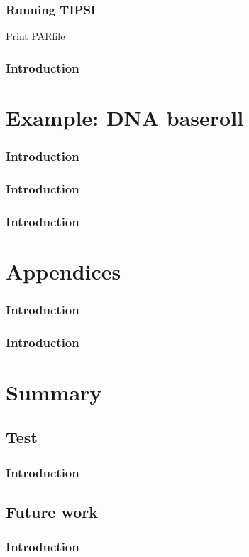 \documentclass[hyperref={pdfpagelabels=false}]{beamer}
\begin{document}
\begin{frame}
\frametitle{Running \textsc{TIPSI}} 

Print PARfile

\end{frame}

\begin{frame}
\frametitle{Introduction} 
\end{frame}

\section{Example: DNA baseroll}
\setcounter{subsection}{1}

\begin{frame}
\frametitle{Introduction} 
\end{frame}

\begin{frame}
\frametitle{Introduction} 
\end{frame}

\begin{frame}
\frametitle{Introduction} 
\end{frame}

\section{Appendices}
\setcounter{subsection}{1}

\begin{frame}
\frametitle{Introduction} 
\end{frame}

\begin{frame}
\frametitle{Introduction} 
\end{frame}

\section{Summary}
\subsection{Test}

\begin{frame}
\frametitle{Introduction} 
\end{frame}

\subsection{Future work}
\begin{frame}
\frametitle{Introduction} 
\end{frame}
\end{document}
